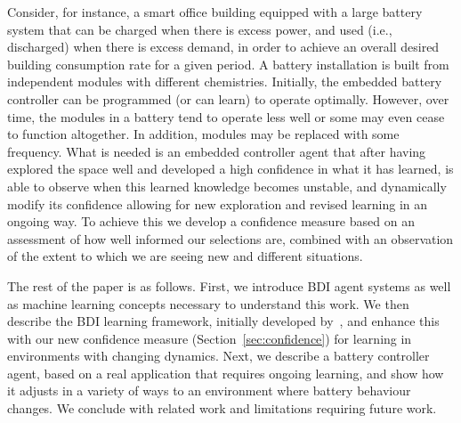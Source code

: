 Consider, for instance, a smart office building equipped with a large
battery system that can be charged when there is excess power, and
used (i.e., discharged) when there is excess demand, in order to
achieve an overall desired building consumption rate for a given
period. A battery installation is built from independent modules with
different chemistries. Initially, the embedded battery controller can
be programmed (or can learn) to operate optimally. However, over time,
the modules in a battery tend to operate less well or some may even
cease to function altogether. In addition, modules may be replaced
with some frequency.   
What is needed is an embedded controller agent that after having explored
the space well and developed a high confidence in what it has learned,
is able to observe when this learned knowledge becomes unstable, and
dynamically modify its confidence allowing for new exploration and
revised learning in an ongoing way. To achieve this we develop a
confidence measure based on an assessment of how well informed our
selections are, combined with an observation of the extent to which we
are seeing new and different situations.

The rest of the paper is as follows.
%
First, we introduce BDI agent systems as well as machine learning
concepts necessary to understand this work.  
%
We then describe the BDI learning framework, initially developed
by~\cite{airiau09:enhancing,singh10:extending,singh10:learning}, and
enhance this with our new confidence measure (Section~\ref{sec:confidence})
for learning in environments with changing dynamics.  
%
Next, we describe a battery controller agent, based on a real
application that requires ongoing learning, and show how it adjusts in
a variety of ways to an environment where battery behaviour changes.  
%
We conclude with related work and limitations requiring future work.




